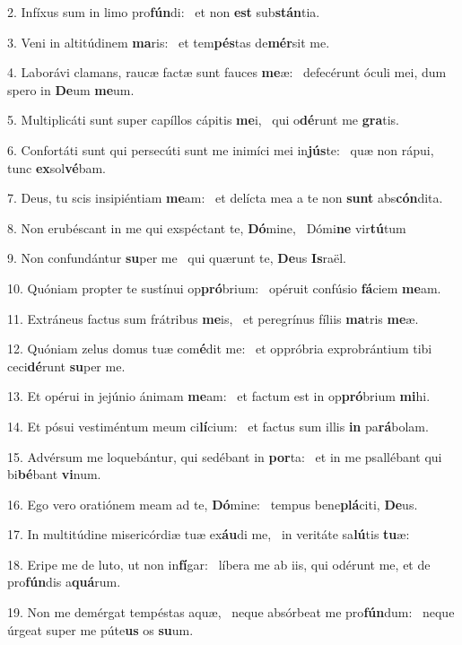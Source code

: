 2. Infíxus sum in limo pro\textbf{fún}di: \ast\  et non \textbf{est} sub\textbf{stán}tia.\

3. Veni in altitúdinem \textbf{ma}ris: \ast\  et tem\textbf{pés}tas de\textbf{mér}sit me.\

4. Laborávi clamans, raucæ factæ sunt fauces \textbf{me}æ: \ast\  defecérunt óculi mei, dum spero in \textbf{De}um \textbf{me}um.\

5. Multiplicáti sunt super capíllos cápitis \textbf{me}i, \ast\  qui o\textbf{dé}runt me \textbf{gra}tis.\

6. Confortáti sunt qui persecúti sunt me inimíci mei in\textbf{jús}te: \ast\  quæ non rápui, tunc \textbf{ex}sol\textbf{vé}bam.\

7. Deus, tu scis insipiéntiam \textbf{me}am: \ast\  et delícta mea a te non \textbf{sunt} abs\textbf{cón}dita.\

8. Non erubéscant in me qui exspéctant te, \textbf{Dó}mine, \ast\  Dómi\textbf{ne} vir\textbf{tú}tum\

9. Non confundántur \textbf{su}per me \ast\  qui quærunt te, \textbf{De}us \textbf{Is}raël.\

10. Quóniam propter te sustínui op\textbf{pró}brium: \ast\  opéruit confúsio \textbf{fá}ciem \textbf{me}am.\

11. Extráneus factus sum frátribus \textbf{me}is, \ast\  et peregrínus fíliis \textbf{ma}tris \textbf{me}æ.\

12. Quóniam zelus domus tuæ com\textbf{é}dit me: \ast\  et oppróbria exprobrántium tibi ceci\textbf{dé}runt \textbf{su}per me.\

13. Et opérui in jejúnio ánimam \textbf{me}am: \ast\  et factum est in op\textbf{pró}brium \textbf{mi}hi.\

14. Et pósui vestiméntum meum ci\textbf{lí}cium: \ast\  et factus sum illis \textbf{in} pa\textbf{rá}bolam.\

15. Advérsum me loquebántur, qui sedébant in \textbf{por}ta: \ast\  et in me psallébant qui bi\textbf{bé}bant \textbf{vi}num.\

16. Ego vero oratiónem meam ad te, \textbf{Dó}mine: \ast\  tempus bene\textbf{plá}citi, \textbf{De}us.\

17. In multitúdine misericórdiæ tuæ ex\textbf{áu}di me, \ast\  in veritáte sa\textbf{lú}tis \textbf{tu}æ:\

18. Eripe me de luto, ut non in\textbf{fí}gar: \ast\  líbera me ab iis, qui odérunt me, et de pro\textbf{fún}dis a\textbf{quá}rum.\

19. Non me demérgat tempéstas aquæ, \dag\  neque absórbeat me pro\textbf{fún}dum: \ast\  neque úrgeat super me púte\textbf{us} os \textbf{su}um.\

